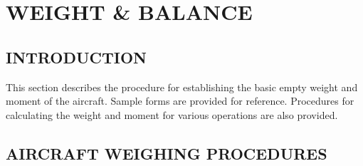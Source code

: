 \chapter{WEIGHT \& BALANCE}
\vspace{\minitocspacebefore}
\minitoc
\cleardoublepage

\section{INTRODUCTION}
This section describes the procedure for establishing the basic empty weight and moment of 
the aircraft. Sample forms are provided for reference. Procedures for calculating the 
weight and moment for various operations are also provided. 

\section{AIRCRAFT WEIGHING PROCEDURES}
